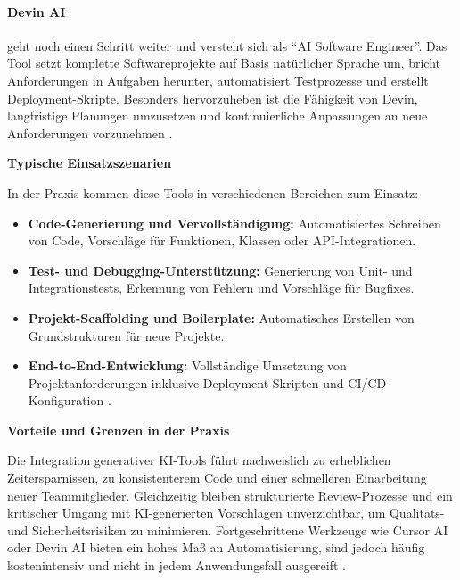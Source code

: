 \paragraph{Devin AI}
geht noch einen Schritt weiter und versteht sich als \enquote{AI Software
    Engineer}. Das Tool setzt komplette Softwareprojekte auf Basis natürlicher
Sprache um, bricht Anforderungen in Aufgaben herunter, automatisiert
Testprozesse und erstellt Deployment-Skripte. Besonders hervorzuheben ist die
Fähigkeit von Devin, langfristige Planungen umzusetzen und kontinuierliche
Anpassungen an neue Anforderungen vorzunehmen \cite{donvir_role_2024}.

\vspace{1em}
\noindent
\textbf{Typische Einsatzszenarien}

In der Praxis kommen diese Tools in verschiedenen Bereichen zum Einsatz:
\begin{itemize}
    \item \textbf{Code-Generierung und Vervollständigung:} Automatisiertes Schreiben von Code, Vorschläge für Funktionen, Klassen oder API-Integrationen.
    \item \textbf{Test- und Debugging-Unterstützung:} Generierung von Unit- und Integrationstests, Erkennung von Fehlern und Vorschläge für Bugfixes.
    \item \textbf{Projekt-Scaffolding und Boilerplate:} Automatisches Erstellen von Grundstrukturen für neue Projekte.
    \item \textbf{End-to-End-Entwicklung:} Vollständige Umsetzung von Projektanforderungen inklusive Deployment-Skripten und CI/CD-Konfiguration \cite{donvir_role_2024}.
\end{itemize}

\vspace{1em}
\noindent
\textbf{Vorteile und Grenzen in der Praxis}

Die Integration generativer KI-Tools führt nachweislich zu erheblichen
Zeitersparnissen, zu konsistenterem Code und einer schnelleren Einarbeitung
neuer Teammitglieder. Gleichzeitig bleiben strukturierte Review-Prozesse und
ein kritischer Umgang mit KI-generierten Vorschlägen unverzichtbar, um
Qualitäts- und Sicherheitsrisiken zu minimieren. Fortgeschrittene Werkzeuge wie
Cursor AI oder Devin AI bieten ein hohes Maß an Automatisierung, sind jedoch
häufig kostenintensiv und nicht in jedem Anwendungsfall ausgereift
\cite{donvir_role_2024}.

